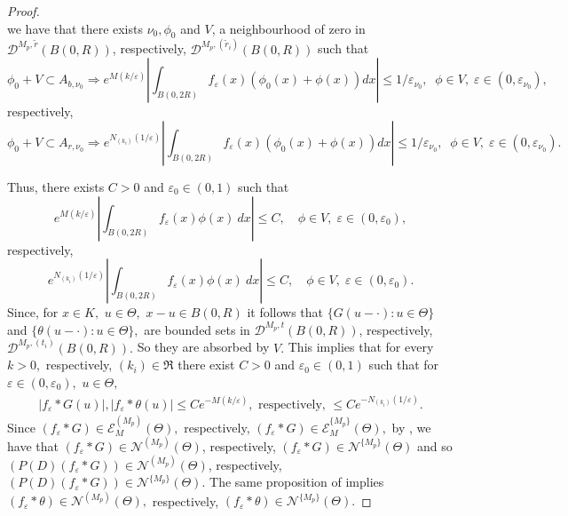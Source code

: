 \documentclass[sn-mathphys,Numbered]{sn-jnl}%
\theoremstyle{thmstyleone}%
\theoremstyle{thmstyletwo}%
\theoremstyle{thmstylethree}%
\begin{document}
\begin{proof}
\begin{equation*}
 \end{equation*}
we have that there exists
$\nu_0, \phi_0$ and  $V$, a neighbourhood of zero in  $\mathcal D^{M_p,\tilde r}(B(0,R))$, respectively, $\mathcal D^{M_p,(\tilde r_i)}(B(0,R))$  such that
\begin{equation*}
\phi_0+V\subset A_{b,{\nu_0}} \Rightarrow e^{M(k/\varepsilon)}\left|\int_{B(0,2R)} f_\varepsilon(x)(\phi_0(x)+\phi(x))dx\right|\leq 1/\varepsilon_{\nu_0},\;\; \phi\in V,\;  \varepsilon\in (0,\varepsilon_{\nu_0}),
\end{equation*}
respectively,
\begin{equation*}
 \phi_0+V\subset A_{r,{\nu_0}} \Rightarrow e^{N_{(k_i)}(1/\varepsilon)}\left|\int_{B(0,2R)} f_\varepsilon(x)(\phi_0(x)+\phi(x))dx\right|\leq  1/\varepsilon_{\nu_0},\;\; \phi\in V,\;  \varepsilon\in (0,\varepsilon_{\nu_0}).
\end{equation*}

Thus, there exists $C>0$ and $\varepsilon_0\in(0,1)$ such that
\begin{equation*}
e^{M(k/\varepsilon)}\left|\int_{B(0,2R)} f_\varepsilon(x)\phi(x)\ dx\right|\leq C,\quad \phi\in V,\;  \varepsilon\in (0,\varepsilon_0),
\end{equation*}
respectively,
\begin{equation*}
e^{N_{(k_i)}(1/\varepsilon)}\left|\int_{B(0,2R)} f_\varepsilon(x)\phi(x)\ dx\right|\leq C,\quad \phi\in V,\;  \varepsilon\in (0,\varepsilon_0).
\end{equation*}
Since, for $x\in K,$ $u\in \Theta,$ $x-u\in B(0,R)$ it follows that $\{G(u-\cdot): u\in\Theta\}$ and $\{\theta(u-\cdot): u\in \Theta\},$ are bounded sets in  $\mathcal D^{M_p,t}(B(0,R))$, respectively,  $\mathcal D^{M_p,(t_i)}(B(0,R)).$ So  they are absorbed by $V.$ 
This implies that for every $k>0,$ respectively, $(k_i)\in\mathfrak R$  there exist $C>0$ and $\varepsilon_0\in (0,1)$ such that for $\varepsilon\in(0,\varepsilon_0),$ $u\in \Theta,$
\begin{align*}%
|f_\varepsilon\ast G(u)|,|f_\varepsilon\ast \theta(u)|\leq C e^{-M(k/\varepsilon)},
\mbox{ respectively, } \leq C e^{-N_{(k_i)}(1/\varepsilon)}.
\end{align*}
Since $(f_\varepsilon\ast G)\in \mathcal{E}^{(M_p)}_M(\Theta),$ respectively,  $(f_\varepsilon\ast G)\in \mathcal{E}^{\{M_p\}}_M(\Theta),$  by \cite[Proposition 4.2]{D.V.1}, we have that $(f_\varepsilon\ast G) \in \mathcal{N}^{(M_p)}(\Theta)$, respectively,  $(f_\varepsilon\ast G)\in \mathcal{N}^{\{M_p\}}(\Theta)$ and so $(P(D)(f_\varepsilon\ast G))\in \mathcal{N}^{(M_p)}(\Theta)$,  respectively,  $(P(D)(f_\varepsilon\ast G))\in \mathcal{N}^{\{M_p\}}(\Theta).$  The same proposition of \cite{D.V.1} implies $(f_\varepsilon\ast \theta)\in \mathcal{N}^{(M_p)}(\Theta),$ respectively, $(f_\varepsilon\ast \theta)\in \mathcal{N}^{\{M_p\}}(\Theta).$ 


\end{proof}
\end{document}

